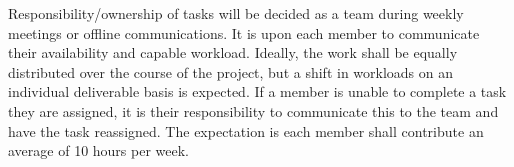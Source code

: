 \documentclass{article}
\begin{document}
Responsibility/ownership of tasks will be decided as a team during weekly meetings or offline
communications. It is upon each member to communicate their availability and capable workload.
Ideally, the work shall be equally distributed over the course of the project, but a shift in
workloads on an individual deliverable basis is expected. If a member is unable to complete a task
they are assigned, it is their responsibility to communicate this to the team and have the task
reassigned. The expectation is each member shall contribute an average of 10 hours per week.
\end{document}
